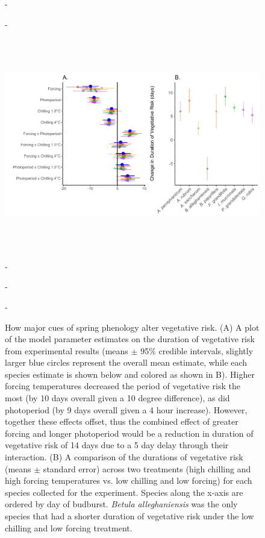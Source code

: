 \documentclass{article}\usepackage[]{graphicx}\usepackage[]{color}
\newcommand*{\figuretitle}[1]{%
    {\centering%
    \par\medskip}%
}
\begin{document}
\begin{figure} [H] 
 -\begin{center}
 \figuretitle{Effects of Cue Interactions on the Duration of Vegetative Risk}
 -\includegraphics[width=16cm, height=10cm]{..//figure/DVR_diffplots_nophoto.pdf} 
 -\caption{How major cues of spring phenology alter vegetative risk. (A) A plot of the model parameter estimates on the duration of vegetative risk from experimental results (means $\pm$ 95\% credible intervals, slightly larger blue circles represent the overall mean estimate, while each species estimate is shown below and colored as shown in B). Higher forcing temperatures decreased the period of vegetative risk the most (by 10 days overall given a 10 degree difference), as did photoperiod (by 9 days overall given a 4 hour increase). However, together these effects offset, thus the combined effect of greater forcing and longer photoperiod would be a reduction in duration of vegetative risk of 14 days due to a 5 day delay through their interaction. (B) A comparison of the durations of vegetative risk (means $\pm$ standard error) across two treatments (high chilling and high forcing temperatures vs. low chilling and low forcing) for each species collected for the experiment. Species along the x-axis are ordered by day of budburst. \textit{Betula alleghaniensis} was the only species that had a shorter duration of vegetative risk under the low chilling and low forcing treatment. }\label{fig:dan} 
 -\end{center}
 -\end{figure}
\end{document}

